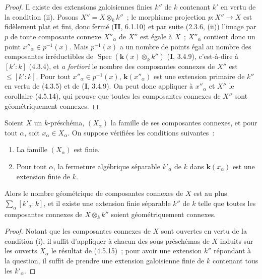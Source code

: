 \begin{proof}
Il existe des extensions galoisiennes finies $k''$ de $k$ contenant $k'$ en
vertu de la condition (ii). Posons $X''=X\otimes_k k''$~; le morphisme
projection $p:X''\to X$ est fidèlement plat et fini, donc fermé (\textbf{II}, 6.1.10) et
par suite (2.3.6, (ii)) l'image par $p$ de toute composante connexe $X''_\alpha$
de $X''$ est égale à $X$~; $X''_\alpha$ contient donc un point
$x''_\alpha\in p^{-1}(x)$. Mais $p^{-1}(x)$ a un nombre de points égal au
nombre des composantes irréductibles de
$\operatorname{Spec}(\boldsymbol{k}(x)\otimes_k k'')$ (\textbf{I}, 3.4.9), c'est-à-dire à $[k':k]$
(4.3.4), et \emph{a fortiori} le nombre des composantes connexes de $X''$ est
$\leqslant[k':k]$. Pour tout $x''_\alpha\in p^{-1}(x)$, $\boldsymbol{k}(x''_\alpha)$ est une
extension primaire de $k''$ en vertu de (4.3.5) et de (\textbf{I}, 3.4.9). On peut donc
appliquer à $x''_\alpha$ et $X''$ le corollaire (4.5.14), qui prouve que toutes
les composantes connexes de $X''$ sont géométriquement connexes.
\end{proof}

\begin{corollary}[4.5.16]
\label{IV.2.4.5.16-fr}
Soient $X$ un $k$-préschéma, $(X_\alpha)$ la famille de ses composantes
connexes, et pour tout $\alpha$, soit $x_\alpha\in X_\alpha$. On suppose
vérifiées les conditions suivantes~:
\begin{enumerate}
\item[\textup{(i)}] La famille $(X_\alpha)$ est finie.
\item[\textup{(ii)}] Pour tout $\alpha$, la fermeture algébrique séparable $k'_\alpha$
de $k$ dans $\boldsymbol{k}(x_\alpha)$ est une extension finie de $k$.
\end{enumerate}
Alors le nombre géométrique de composantes connexes de $X$ est au plus
$\sum_\alpha[k'_\alpha:k]$, et il existe une extension finie séparable $k''$ de
$k$ telle que toutes les composantes connexes de $X\otimes_k k''$ soient
géométriquement connexes.
\end{corollary}

\begin{proof}
Notant que les composantes connexes de $X$ sont ouvertes en vertu de la
condition (i), il suffit d'appliquer à chacun des sous-préschémas de $X$ induits
sur les ouverts $X_\alpha$ le résultat de (4.5.15)~; pour avoir une extension
$k''$ répondant à la question, il suffit de prendre une extension galoisienne
finie de $k$ contenant tous les $k'_\alpha$.
\end{proof}

